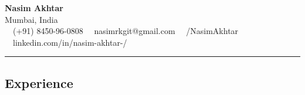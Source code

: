 \documentclass[11pt,letterpaper]{article}
\begin{document}
\begin{center}
	{\LARGE \textbf{Nasim Akhtar}}\\
	Mumbai, India
	\vspace{0.05cm}
	\\
	\raisebox{-0.2\height} {\Large \faPhoneSquare} \ \  (+91) 8450-96-0808 \hfill\raisebox{-0.2\height}{\Large \faEnvelopeSquare} \ \ nasimrkgit@gmail.com \hfill \raisebox{-0.2\height}{\Large \faGithubSquare} \ \ /NasimAkhtar \hfill \raisebox{-0.2\height}{\Large \faLinkedinSquare} \ \ linkedin.com/in/nasim-akhtar-/
\end{center}

\hrule
\vspace{-1em}
\subsection*{\Large Experience}
\end{document}
